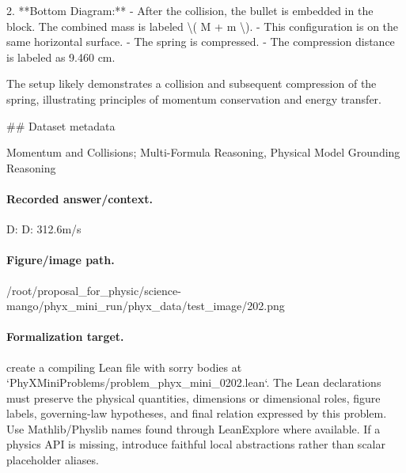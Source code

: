2. **Bottom Diagram:**
   - After the collision, the bullet is embedded in the block. The combined mass is labeled \textbackslash{}( M + m \textbackslash{}).
   - This configuration is on the same horizontal surface.
   - The spring is compressed.
   - The compression distance is labeled as 9.460 cm.

The setup likely demonstrates a collision and subsequent compression of the spring, illustrating principles of momentum conservation and energy transfer.

\#\# Dataset metadata

Momentum and Collisions; Multi-Formula Reasoning, Physical Model Grounding Reasoning

\paragraph{Recorded answer/context.}
D: D: 312.6m/s

\paragraph{Figure/image path.}
/root/proposal\_for\_physic/science-mango/phyx\_mini\_run/phyx\_data/test\_image/202.png

\paragraph{Formalization target.}
create a compiling Lean file with sorry bodies at `PhyXMiniProblems/problem\_phyx\_mini\_0202.lean`. The Lean declarations must preserve the physical quantities, dimensions or dimensional roles, figure labels, governing-law hypotheses, and final relation expressed by this problem.
Use Mathlib/Physlib names found through LeanExplore where available. If a physics API is missing, introduce faithful local abstractions rather than scalar placeholder aliases.

